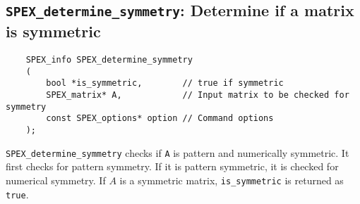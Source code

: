 \documentclass[12pt,oneside]{book}
\theoremstyle{definition}
\begin{document}
\subsection{\texttt{SPEX\_determine\_symmetry}: Determine if a matrix is symmetric}
\begin{mdframed}[userdefinedwidth=\textwidth]
{\footnotesize
\begin{verbatim}
    SPEX_info SPEX_determine_symmetry
    (
        bool *is_symmetric,        // true if symmetric
        SPEX_matrix* A,            // Input matrix to be checked for symmetry
        const SPEX_options* option // Command options
    ); 
\end{verbatim}
} \end{mdframed}

\verb|SPEX_determine_symmetry| checks if \verb|A| is pattern and numerically symmetric. It first checks for pattern symmetry. If it is pattern symmetric, it is checked for numerical symmetry. If $A$ is a symmetric matrix, \verb|is_symmetric| is returned as \verb|true|. 

\end{document}
